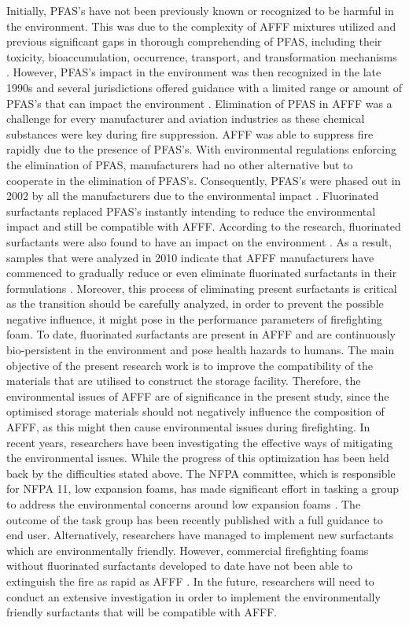 Initially, PFAS's have not been previously known or recognized to be harmful in the environment. This was due to the complexity of AFFF mixtures utilized and previous significant gaps in thorough comprehending of PFAS, including their toxicity, bioaccumulation, occurrence, transport, and transformation mechanisms \cite{milley2018estimating}. However, PFAS's impact in the environment was then recognized in the late 1990s and several jurisdictions offered guidance with a limited range or amount of PFAS's that can impact the environment \cite{hinnant2017influence}.
Elimination of PFAS in AFFF was a challenge for every manufacturer and aviation industries as these chemical substances were key during fire suppression. AFFF was able to suppress fire rapidly due to the presence of PFAS's. With environmental regulations enforcing the elimination of PFAS, manufacturers had no other alternative but to cooperate in the elimination of PFAS's. Consequently, PFAS's were phased out in 2002 by all the manufacturers due to the environmental impact \cite{persson2003foamspex}.  Fluorinated surfactants replaced PFAS's instantly intending to reduce the environmental impact and still be compatible with AFFF. 
According to the research, fluorinated surfactants were also found to have an impact on the environment \cite{martin2012fire}. As a result, samples that were analyzed in 2010 indicate that AFFF manufacturers have commenced to gradually reduce or even eliminate fluorinated surfactants in their formulations \cite{milley2018estimating}. Moreover, this process of eliminating present surfactants is critical as the transition should be carefully analyzed, in order to prevent the possible negative influence, it might pose in the performance parameters of firefighting foam. To date, fluorinated surfactants are present in AFFF and are continuously bio-persistent in the environment and pose health hazards to humans.
The main objective of the present research work is to improve the compatibility of the materials that are utilised to construct the storage facility. Therefore, the environmental issues of AFFF are of significance in the present study, since the optimised storage materials should not negatively influence the composition of AFFF, as this might then cause environmental issues during firefighting. 
In recent years, researchers have been investigating the effective ways of mitigating the environmental issues. While the progress of this optimization has been held back by the difficulties stated above. The NFPA committee, which is responsible for NFPA 11, low expansion foams, has made significant effort in tasking a group to address the environmental concerns around low expansion foams \cite{scheffey1995evaluating}. The outcome of the task group has been recently published with a full guidance to end user\cite{scheffey1995evaluating}. Alternatively, researchers have managed to implement new surfactants which are environmentally friendly. However, commercial firefighting foams without fluorinated surfactants developed to date have not been able to extinguish the fire as rapid as AFFF \cite{hinnant2017influence}. In the future, researchers will need to conduct an extensive investigation in order to implement the environmentally friendly surfactants that will be compatible with AFFF.  

